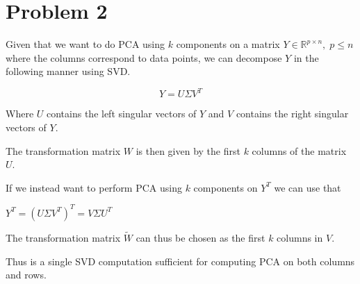 \section*{Problem 2}

Given that we want to do PCA using $k$ components on a matrix $Y \in \mathbb{R}^{p \times n}, \; p \leq n$ where the columns correspond to data points, we can decompose $Y$ in the following manner using SVD.

\begin{equation}
  Y = U \Sigma V^T
\end{equation}

Where $U$ contains the left singular vectors of $Y$ and $V$ contains the right singular vectors of $Y$.

The transformation matrix $W$ is then given by the first $k$ columns of the matrix $U$.

If we instead want to perform PCA using $k$ components on $Y^T$ we can use that

$Y^T = (U \Sigma V^T)^T = V \Sigma U^T$

The transformation matrix $\widetilde{W}$ can thus be chosen as the first $k$ columns in $V$.


Thus is a single SVD computation sufficient for computing PCA on both columns and rows. 
